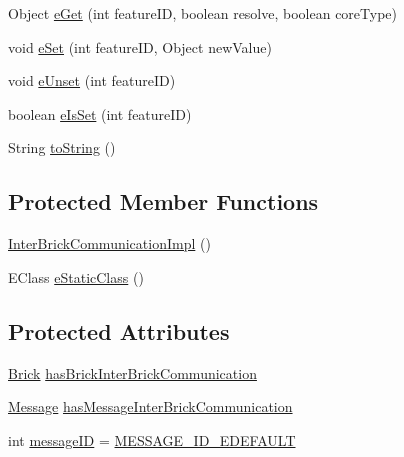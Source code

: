 \begin{DoxyCompactItemize}
\item 
Object \hyperlink{classshootingmachineemfmodel_1_1impl_1_1_inter_brick_communication_impl_a06b9e3cf4b3f7751712cbeec8bcd281b}{e\-Get} (int feature\-I\-D, boolean resolve, boolean core\-Type)
\item 
void \hyperlink{classshootingmachineemfmodel_1_1impl_1_1_inter_brick_communication_impl_a796c22f5f2a6ba90db0949a6599855cb}{e\-Set} (int feature\-I\-D, Object new\-Value)
\item 
void \hyperlink{classshootingmachineemfmodel_1_1impl_1_1_inter_brick_communication_impl_a57e6eb4c83bad4ca86a3a20af4ffa8ea}{e\-Unset} (int feature\-I\-D)
\item 
boolean \hyperlink{classshootingmachineemfmodel_1_1impl_1_1_inter_brick_communication_impl_afe8bce84586d4fd6d0a3ef980f6ea8b2}{e\-Is\-Set} (int feature\-I\-D)
\item 
String \hyperlink{classshootingmachineemfmodel_1_1impl_1_1_inter_brick_communication_impl_a62053a8e7cde15cd2aa88d49be129129}{to\-String} ()
\end{DoxyCompactItemize}
\subsection*{Protected Member Functions}
\begin{DoxyCompactItemize}
\item 
\hyperlink{classshootingmachineemfmodel_1_1impl_1_1_inter_brick_communication_impl_aeb591229a23e10ce831ec24313db0252}{Inter\-Brick\-Communication\-Impl} ()
\item 
E\-Class \hyperlink{classshootingmachineemfmodel_1_1impl_1_1_inter_brick_communication_impl_a826844356c5bce4482d877775084412c}{e\-Static\-Class} ()
\end{DoxyCompactItemize}
\subsection*{Protected Attributes}
\begin{DoxyCompactItemize}
\item 
\hyperlink{interfaceshootingmachineemfmodel_1_1_brick}{Brick} \hyperlink{classshootingmachineemfmodel_1_1impl_1_1_inter_brick_communication_impl_a515be89902ccb9eb20072e29275de6c9}{has\-Brick\-Inter\-Brick\-Communication}
\item 
\hyperlink{interfaceshootingmachineemfmodel_1_1_message}{Message} \hyperlink{classshootingmachineemfmodel_1_1impl_1_1_inter_brick_communication_impl_a2a802dec243d014b42fba80edaca85eb}{has\-Message\-Inter\-Brick\-Communication}
\item 
int \hyperlink{classshootingmachineemfmodel_1_1impl_1_1_inter_brick_communication_impl_a2b87fd3de3c67ba80aafb38cb48fd455}{message\-I\-D} = \hyperlink{classshootingmachineemfmodel_1_1impl_1_1_inter_brick_communication_impl_a7bc71e77fb5709025d118e5488d34663}{M\-E\-S\-S\-A\-G\-E\-\_\-\-I\-D\-\_\-\-E\-D\-E\-F\-A\-U\-L\-T}
\end{DoxyCompactItemize}

